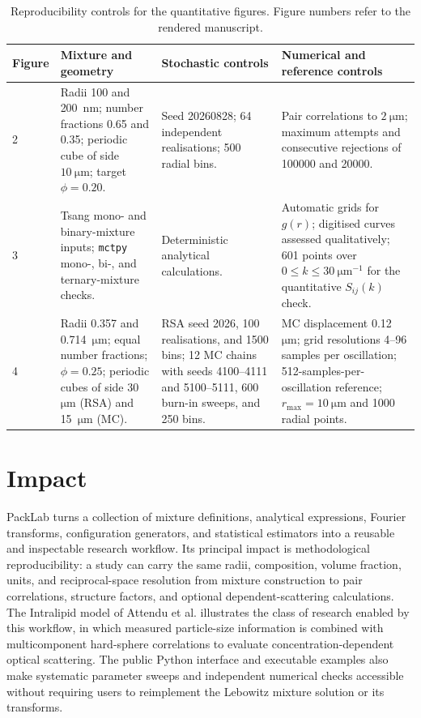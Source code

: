 \documentclass[preprint,12pt]{elsarticle}
\begin{document}
\begin{table}[t]
\centering
\footnotesize
\caption{Reproducibility controls for the quantitative figures. Figure numbers refer to the rendered manuscript.}
\label{tab:reproducibility}
\begin{tabularx}{\textwidth}{@{}p{0.42in}YYY@{}}
\toprule
Figure & Mixture and geometry & Stochastic controls & Numerical and reference controls \\
 & Radii 100 and 200~nm; number fractions 0.65 and 0.35; periodic cube of side $10~\mathrm{\mu m}$; target $\phi=0.20$. & Seed 20260828; 64 independent realisations; 500 radial bins. & Pair correlations to $2~\mathrm{\mu m}$; maximum attempts and consecutive rejections of 100000 and 20000. \\
3 & Tsang mono- and binary-mixture inputs; \texttt{mctpy} mono-, bi-, and ternary-mixture checks. & Deterministic analytical calculations. & Automatic grids for $g(r)$; digitised curves assessed qualitatively; 601 points over $0\!\leq\!k\!\leq\!30~\mathrm{\mu m}^{-1}$ for the quantitative $S_{ij}(k)$ check. \\
4 & Radii 0.357 and 0.714~$\mathrm{\mu m}$; equal number fractions; $\phi=0.25$; periodic cubes of side 30~$\mathrm{\mu m}$ (RSA) and 15~$\mathrm{\mu m}$ (MC). & RSA seed 2026, 100 realisations, and 1500 bins; 12 MC chains with seeds 4100--4111 and 5100--5111, 600 burn-in sweeps, and 250 bins. & MC displacement 0.12~$\mathrm{\mu m}$; grid resolutions 4--96 samples per oscillation; 512-samples-per-oscillation reference; $r_{\max}=10~\mathrm{\mu m}$ and 1000 radial points. \\
\bottomrule
\end{tabularx}
\end{table}

\section{Impact}

PackLab turns a collection of mixture definitions, analytical expressions, Fourier transforms, configuration generators, and statistical estimators into a reusable and inspectable research workflow. %
Its principal impact is methodological reproducibility: a study can carry the same radii, composition, volume fraction, units, and reciprocal-space resolution from mixture construction to pair correlations, structure factors, and optional dependent-scattering calculations. %
The Intralipid model of Attendu et al. \cite{Attendu2026} illustrates the class of research enabled by this workflow, in which measured particle-size information is combined with multicomponent hard-sphere correlations to evaluate concentration-dependent optical scattering. %
The public Python interface and executable examples also make systematic parameter sweeps and independent numerical checks accessible without requiring users to reimplement the Lebowitz mixture solution or its transforms. %
\end{document}
